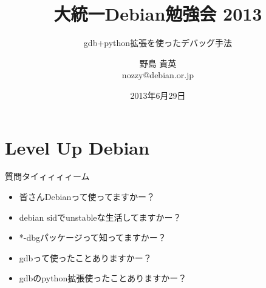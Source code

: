\title{大統一Debian勉強会 2013}
\subtitle{gdb+python拡張を使ったデバッグ手法}
\author{野島 貴英\\nozzy@debian.or.jp}
\date{2013年6月29日}



\frame{\titlepage{}}

\section{Level Up Debian}

\begin{frame}{質問タイィィィィーム}

\begin {itemize}[<+->]
\item 皆さんDebianって使ってますかー？
\item debian sidでunstableな生活してますかー？
\item *-dbgパッケージって知ってますかー？
\item gdbって使ったことありますかー？
\item gdbのpython拡張使ったことありますかー？
\end{itemize}

\end{frame}

